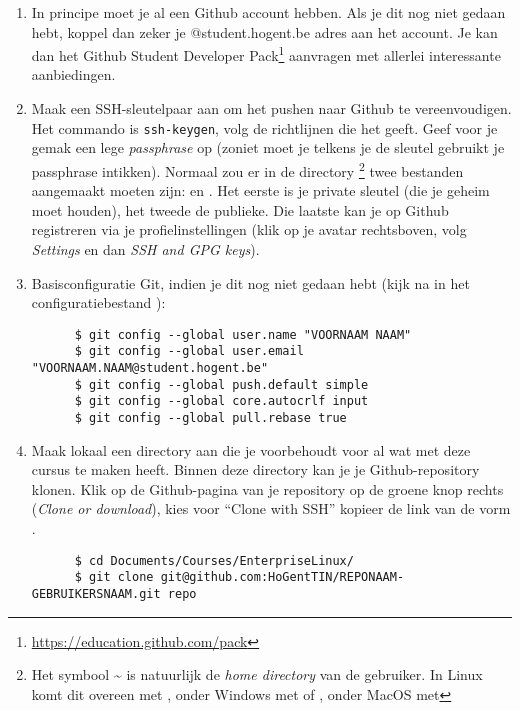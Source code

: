 \begin{enumerate}
  \item In principe moet je al een Github account hebben. Als je dit nog niet gedaan hebt, koppel dan zeker je @student.hogent.be adres aan het account. Je kan dan het Github Student Developer Pack\footnote{\url{https://education.github.com/pack}} aanvragen met allerlei interessante aanbiedingen.
  \item Maak een SSH-sleutelpaar aan om het pushen naar Github te vereenvoudigen. Het commando is \texttt{ssh-keygen}, volg de richtlijnen die het geeft. Geef voor je gemak een lege \emph{passphrase} op (zoniet moet je telkens je de sleutel gebruikt je passphrase intikken). Normaal zou er in de directory \footnote{Het symbool {\textasciitilde} is natuurlijk de \emph{home directory} van de gebruiker. In Linux komt dit overeen met , onder Windows met  of , onder MacOS met } twee bestanden aangemaakt moeten zijn:  en . Het eerste is je private sleutel (die je geheim moet houden), het tweede de publieke. Die laatste kan je op Github registreren via je profielinstellingen (klik op je avatar rechtsboven, volg \emph{Settings} en dan \emph{SSH and GPG keys}).

  \item Basisconfiguratie Git, indien je dit nog niet gedaan hebt (kijk na in het configuratiebestand ):

    \begin{verbatim}
      $ git config --global user.name "VOORNAAM NAAM"
      $ git config --global user.email "VOORNAAM.NAAM@student.hogent.be"
      $ git config --global push.default simple
      $ git config --global core.autocrlf input
      $ git config --global pull.rebase true
    \end{verbatim}

  \item Maak lokaal een directory aan die je voorbehoudt voor al wat met deze cursus te maken heeft. Binnen deze directory kan je je Github-repository klonen. Klik op de Github-pagina van je repository op de groene knop rechts (\emph{Clone or download}), kies voor ``Clone with SSH'' kopieer de link van de vorm .

    \begin{verbatim}
      $ cd Documents/Courses/EnterpriseLinux/
      $ git clone git@github.com:HoGentTIN/REPONAAM-GEBRUIKERSNAAM.git repo
    \end{verbatim}


\end{enumerate}
